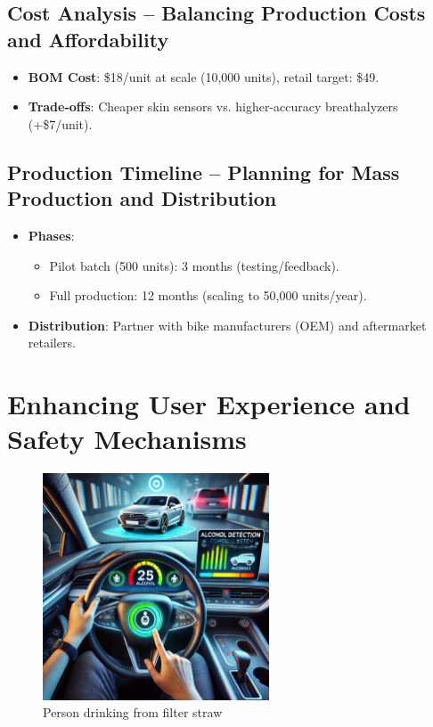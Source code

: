 \documentclass{article}
\begin{document}
\subsection{Cost Analysis -- Balancing Production Costs and Affordability}
\begin{itemize}
    \item \textbf{BOM Cost}: \$18/unit at scale (10,000 units), retail target: \$49.
    \item \textbf{Trade-offs}: Cheaper skin sensors vs. higher-accuracy breathalyzers (+\$7/unit).
\end{itemize}

\subsection{Production Timeline -- Planning for Mass Production and Distribution}
\begin{itemize}
    \item \textbf{Phases}:
    \begin{itemize}
        \item Pilot batch (500 units): 3 months (testing/feedback).
        \item Full production: 12 months (scaling to 50,000 units/year).
    \end{itemize}
    \item \textbf{Distribution}: Partner with bike manufacturers (OEM) and aftermarket retailers.
\end{itemize}

\newpage

\section{Enhancing User Experience and Safety Mechanisms}

\begin{figure}[h!]
    \centering
    \includegraphics[width=0.6\textwidth]{ac/7.jpg}
    \caption{Person drinking from filter straw}
    \label{fig:Drinking_water}
\end{figure}
\end{document}
